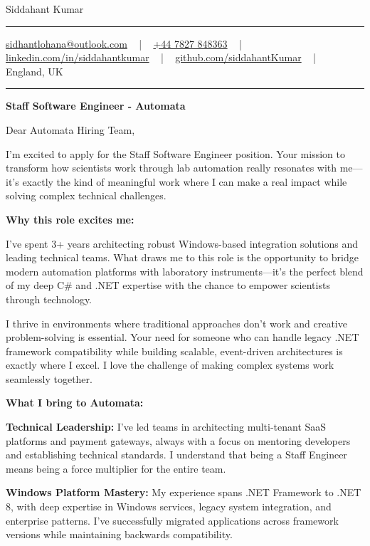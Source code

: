 \documentclass[letterpaper,10pt]{article}
\newcommand{\documentTitle}[2]{
  \begin{center}
    \vspace*{-0.3in}
    {\Huge\color{accentTitle} #1}
    \vspace{8pt}
    {\color{accentLine} \hrule}
    \vspace{2pt}
    \footnotesize{#2}
    \vspace{2pt}
    {\color{accentLine} \hrule}
  \end{center}
}
\begin{document}
\documentTitle{Siddahant Kumar}{
\vspace{0.1cm}
\href{mailto:sidhantlohana@outlook.com}{sidhantlohana@outlook.com} ~ | ~
\href{tel:+447827848363}{+44 7827 848363} ~ | ~
\href{https://www.linkedin.com/in/siddahantkumar/}{linkedin.com/in/siddahantkumar} ~ | ~
\href{https://github.com/siddahantKumar}{github.com/siddahantKumar} ~ | ~
England, UK
}

\begin{center}
\textbf{Staff Software Engineer - Automata}
\end{center}

\vspace{10pt}

Dear Automata Hiring Team,

I'm excited to apply for the Staff Software Engineer position. Your mission to transform how scientists work through lab automation really resonates with me—it's exactly the kind of meaningful work where I can make a real impact while solving complex technical challenges.

\textbf{Why this role excites me:}

I've spent 3+ years architecting robust Windows-based integration solutions and leading technical teams. What draws me to this role is the opportunity to bridge modern automation platforms with laboratory instruments—it's the perfect blend of my deep C\# and .NET expertise with the chance to empower scientists through technology.

I thrive in environments where traditional approaches don't work and creative problem-solving is essential. Your need for someone who can handle legacy .NET framework compatibility while building scalable, event-driven architectures is exactly where I excel. I love the challenge of making complex systems work seamlessly together.

\vspace{10pt}

\textbf{What I bring to Automata:}

\textbf{Technical Leadership:} I've led teams in architecting multi-tenant SaaS platforms and payment gateways, always with a focus on mentoring developers and establishing technical standards. I understand that being a Staff Engineer means being a force multiplier for the entire team.

\textbf{Windows Platform Mastery:} My experience spans .NET Framework to .NET 8, with deep expertise in Windows services, legacy system integration, and enterprise patterns. I've successfully migrated applications across framework versions while maintaining backwards compatibility.
\end{document}
